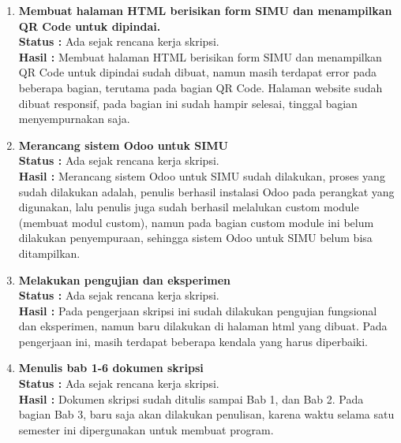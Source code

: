 \documentclass[a4paper,twoside]{article}
\begin{document}
\begin{enumerate}
		\item \textbf{Membuat halaman HTML berisikan form SIMU dan menampilkan QR Code untuk dipindai.}\\
		{\bf Status :} Ada sejak rencana kerja skripsi.\\
		{\bf Hasil :} Membuat halaman HTML berisikan form SIMU dan menampilkan QR Code untuk dipindai sudah dibuat, namun masih terdapat error pada beberapa bagian, terutama pada bagian QR Code. Halaman website sudah dibuat responsif, pada bagian ini sudah hampir selesai, tinggal bagian menyempurnakan saja.

		\item \textbf{Merancang sistem Odoo untuk SIMU}\\
		{\bf Status :} Ada sejak rencana kerja skripsi.\\
		{\bf Hasil :} Merancang sistem Odoo untuk SIMU sudah dilakukan, proses yang sudah dilakukan adalah, penulis berhasil instalasi Odoo pada perangkat yang digunakan, lalu penulis juga sudah berhasil melalukan custom module (membuat modul custom), namun pada bagian custom module ini belum dilakukan penyempuraan, sehingga sistem Odoo untuk SIMU belum bisa ditampilkan.

		\item \textbf{Melakukan pengujian dan eksperimen}\\
		{\bf Status :} Ada sejak rencana kerja skripsi.\\
		{\bf Hasil :} Pada pengerjaan skripsi ini sudah dilakukan pengujian fungsional dan eksperimen, namun baru dilakukan di halaman html yang dibuat. Pada pengerjaan ini, masih terdapat beberapa kendala yang harus diperbaiki.

		\item \textbf{ Menulis bab 1-6 dokumen skripsi}\\
		{\bf Status :} Ada sejak rencana kerja skripsi.\\
		{\bf Hasil :} Dokumen skripsi sudah ditulis sampai Bab 1, dan Bab 2. Pada bagian Bab 3, baru saja akan dilakukan penulisan, karena waktu selama satu semester ini dipergunakan untuk membuat program.

	\end{enumerate}
\end{document}
